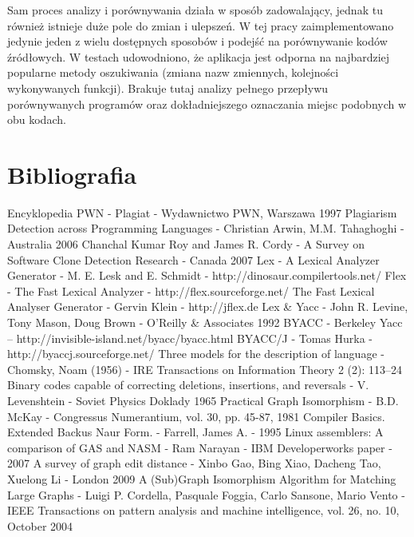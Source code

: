 \documentclass[a4paper,12pt,twoside]{article}
\begin{document}
Sam proces analizy i porównywania działa w sposób zadowalający, jednak tu również istnieje duże pole do zmian i ulepszeń. W tej pracy zaimplementowano jedynie jeden z wielu dostępnych sposobów i podejść na porównywanie kodów źródłowych. W testach udowodniono, że aplikacja jest odporna na najbardziej popularne metody oszukiwania (zmiana nazw zmiennych, kolejności wykonywanych funkcji). Brakuje tutaj analizy pełnego przepływu porównywanych programów oraz dokładniejszego oznaczania miejsc podobnych w obu kodach.

\newpage

\section{Bibliografia}

\begin{thebibliography}{1}
 Encyklopedia PWN - Plagiat - Wydawnictwo PWN, Warszawa 1997
 Plagiarism Detection across Programming Languages - Christian Arwin, M.M. Tahaghoghi - Australia 2006
 Chanchal Kumar Roy and James R. Cordy - A Survey on Software Clone Detection Research - Canada 2007
 Lex - A Lexical Analyzer Generator - M. E. Lesk and E. Schmidt - http://dinosaur.compilertools.net/
 Flex - The Fast Lexical Analyzer - http://flex.sourceforge.net/
 The Fast Lexical Analyser Generator - Gervin Klein - http://jflex.de
 Lex & Yacc - John R. Levine, Tony Mason, Doug Brown - O'Reilly & Associates 1992
 BYACC - Berkeley Yacc -- http://invisible-island.net/byacc/byacc.html
 BYACC/J - Tomas Hurka - http://byaccj.sourceforge.net/
 Three models for the description of language - Chomsky, Noam (1956) - IRE Transactions on Information Theory 2 (2): 113–24
 Binary codes capable of correcting deletions, insertions, and reversals - V. Levenshtein - Soviet Physics Doklady 1965
 Practical Graph Isomorphism - B.D. McKay - Congressus Numerantium,
vol. 30, pp. 45-87, 1981
 Compiler Basics. Extended Backus Naur Form. - Farrell, James A. - 1995
 Linux assemblers: A comparison of GAS and NASM - Ram Narayan - IBM Developerworks paper - 2007
 A survey of graph edit distance - Xinbo Gao, Bing Xiao, Dacheng Tao, Xuelong Li - London 2009
 A (Sub)Graph Isomorphism Algorithm for Matching Large Graphs - Luigi P. Cordella, Pasquale Foggia, Carlo Sansone, Mario Vento - IEEE Transactions on pattern analysis and machine intelligence, vol. 26, no. 10, October 2004

\end{thebibliography}
\end{document}
